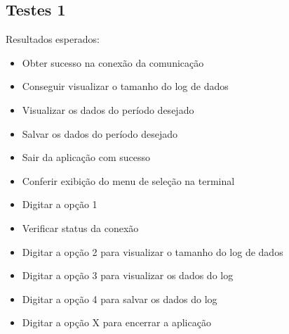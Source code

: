 \documentclass[10pt,twocolumn,letterpaper]{article}
\begin{document}
\subsection*{Testes 1}
Resultados esperados:
\begin{itemize}
  \item Obter sucesso na conexão da comunicação
  \item Conseguir visualizar o tamanho do log de dados
  \item Visualizar os dados do período desejado
  \item Salvar os dados do período desejado
  \item Sair da aplicação com sucesso
\end{itemize}

\begin{itemize}
  \item Conferir exibição do menu de seleção na terminal
  \item Digitar a opção 1
  \item Verificar status da conexão
  \item Digitar a opção 2 para visualizar o tamanho do log de dados
  \item Digitar a opção 3 para visualizar os dados do log
  \item Digitar a opção 4 para salvar os dados do log
  \item Digitar a opção X para encerrar a aplicação
\end{itemize}
\end{document}
